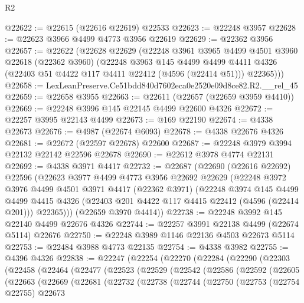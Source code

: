 \begin{lexlean}{R2}
\begin{coremodule}
@22622 := @22615 (@22616 @22619) @22533
@22623 := @22248 @3957
@22628 := @22623 @3966 @4499 @4773 @3956 @22619
@22629 := @22362 @3956
@22657 := @22622
    (@22628
      @22629
      (@22248
        @3961
        @3965
        @4499
        @4501
        @3960
        @22618
        (@22362 @3960)
        (@22248
          @3963
          @145
          @4499
          @4499
          @4411
          @4326
          (@22403 @51 @4422 @117 @4411 @22412 (@4596 (@22414 @51)))
          @22365)))
@22658 := LexLeanPreserve.Ce51bdd840d7602eca0e2520e09d8ce82.R2.__rel_45
@22659 := @22658 @3955
@22663 := @22611 (@22657 (@22659 @3959 @4410))
@22669 := @22248 @3996 @145 @22145 @4499 @22600 @4326
@22672 := @22257 @3995 @22143 @4499
@22673 := @169 @22190
@22674 := @4338 @22673
@22676 := @4987 (@22674 @6093)
@22678 := @4338 @22676 @4326
@22681 := @22672 (@22597 @22678) @22600
@22687 := @22248 @3979 @3994 @22132 @22142 @22596 @22678
@22690 := @22612 @3978 @4774 @22131
@22692 := @4338 @3971 @4417
@22732 := @22687
    (@22690
      (@22616 @22692)
      @22596
      (@22623
        @3977
        @4499
        @4773
        @3956
        @22692
        @22629
        (@22248
          @3972
          @3976
          @4499
          @4501
          @3971
          @4417
          (@22362 @3971)
          (@22248
            @3974
            @145
            @4499
            @4499
            @4415
            @4326
            (@22403 @201 @4422 @117 @4415 @22412 (@4596 (@22414 @201)))
            @22365)))
      (@22659 @3970 @4414))
@22738 := @22248 @3992 @145 @22140 @4499 @22676 @4326
@22744 := @22257 @3991 @22138 @4499 (@22674 @5114) @22676
@22750 := @22248 @3989 @1146 @22136 @4503 @22673 @5114
@22753 := @22484 @3988 @4773 @22135
@22754 := @4338 @3982
@22755 := @4396 @4326
@22838 := @22247
    (@22254
      (@22270
        (@22284
          (@22290
            (@22303
              (@22458
                (@22464
                  (@22477
                    (@22523
                      (@22529
                        (@22542
                          (@22586
                            (@22592
                              (@22605
                                (@22663
                                  (@22669
                                    (@22681
                                      (@22732
                                        (@22738
                                          (@22744
                                            (@22750
                                              (@22753
                                                (@22754 @22755)
                                                @22673

\end{coremodule}
\end{lexlean}
